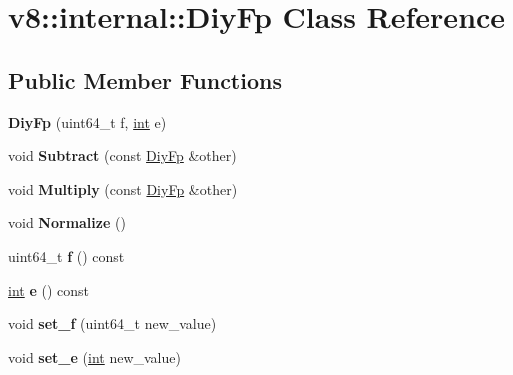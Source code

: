 \hypertarget{classv8_1_1internal_1_1DiyFp}{}\section{v8\+:\+:internal\+:\+:Diy\+Fp Class Reference}
\label{classv8_1_1internal_1_1DiyFp}
\subsection*{Public Member Functions}
\begin{DoxyCompactItemize}
\item 
\mbox{\label{classv8_1_1internal_1_1DiyFp_a706c119a6d9aa35dcf0781f2e2a283a0}} 
{\bfseries Diy\+Fp} (uint64\+\_\+t f, \mbox{\hyperlink{classint}{int}} e)
\item 
\mbox{\label{classv8_1_1internal_1_1DiyFp_ad59641acca06e61296ab5b9436bcbe85}} 
void {\bfseries Subtract} (const \mbox{\hyperlink{classv8_1_1internal_1_1DiyFp}{Diy\+Fp}} \&other)
\item 
\mbox{\label{classv8_1_1internal_1_1DiyFp_a50c7369cc4e9d7e9c3add0f7a4818645}} 
void {\bfseries Multiply} (const \mbox{\hyperlink{classv8_1_1internal_1_1DiyFp}{Diy\+Fp}} \&other)
\item 
\mbox{\label{classv8_1_1internal_1_1DiyFp_a39ba5a89a07fe9feaa4de5695da55310}} 
void {\bfseries Normalize} ()
\item 
\mbox{\label{classv8_1_1internal_1_1DiyFp_ab39468ffb6493a039d04a0493f56e704}} 
uint64\+\_\+t {\bfseries f} () const
\item 
\mbox{\label{classv8_1_1internal_1_1DiyFp_aecb3829d5d958aac7f1c8a77bd1e9368}} 
\mbox{\hyperlink{classint}{int}} {\bfseries e} () const
\item 
\mbox{\label{classv8_1_1internal_1_1DiyFp_a95098aea05a2339189be1547512423e1}} 
void {\bfseries set\+\_\+f} (uint64\+\_\+t new\+\_\+value)
\item 
\mbox{\label{classv8_1_1internal_1_1DiyFp_a64c435e55ebd3bfd48b1a5b00d9be055}} 
void {\bfseries set\+\_\+e} (\mbox{\hyperlink{classint}{int}} new\+\_\+value)
\end{DoxyCompactItemize}
